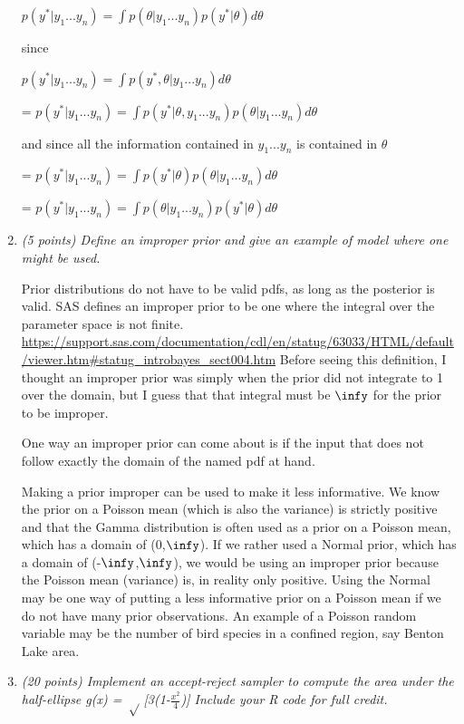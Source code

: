 \documentclass{article}\usepackage[]{graphicx}\usepackage[]{color}
\begin{document}
\begin{enumerate}
$p(y^{*}|y_{1}...y_{n}) = \int p(\theta|y_{1}...y_{n})p(y^{*}|\theta) d\theta$

since 

$p(y^{*}|y_{1}...y_{n}) = \int p(y^{*},\theta|y_{1}...y_{n}) d\theta$

= $p(y^{*}|y_{1}...y_{n}) = \int p(y^{*}|\theta,y_{1}...y_{n})p(\theta|y_{1}...y_{n}) d\theta$

and since all the information contained in $y_{1}...y_{n}$ is contained in $\theta$

= $p(y^{*}|y_{1}...y_{n}) = \int p(y^{*}|\theta)p(\theta|y_{1}...y_{n}) d\theta$

= $p(y^{*}|y_{1}...y_{n}) = \int p(\theta|y_{1}...y_{n})p(y^{*}|\theta) d\theta$


\item %
{\it (5 points) Define an improper prior and give an example of model where one might be used.}

Prior distributions do not have to be valid pdfs, as long as the posterior is valid. SAS defines an improper prior to be one where the integral over the parameter space is not finite. \url{https://support.sas.com/documentation/cdl/en/statug/63033/HTML/default/viewer.htm#statug_introbayes_sect004.htm} Before seeing this definition, I thought an improper prior was simply when the prior did not integrate to 1 over the domain, but I guess that that integral must be $\infy$ for the prior to be improper.

One way an improper prior can come about is if the input that does not follow exactly the domain of the named pdf at hand.

Making a prior improper can be used to make it less informative. We know the prior on a Poisson mean (which is also the variance) is strictly positive and that the Gamma distribution is often used as a prior on a Poisson mean, which has a domain of (0,$\infy$). If we rather used a Normal prior, which has a domain of (-$\infy$,$\infy$), we would be using an improper prior because the Poisson mean (variance) is, in reality only positive. Using the Normal may be one way of putting a less informative prior on a Poisson mean if we do not have many prior observations. An example of a Poisson random variable may be the number of bird species in a confined region, say Benton Lake area.

\item%
{\it (20 points) Implement an accept-reject sampler to compute the area under the half-ellipse g(x) = $\sqrt$ [3(1-$\frac{x^2}{4}$)] Include your R code for full credit.}



\end{enumerate}
\end{document}
